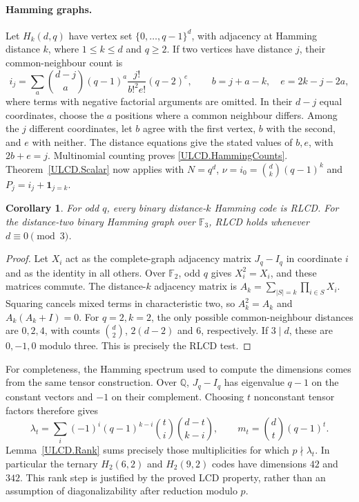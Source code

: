 \documentclass[11pt,a4paper]{article}
\newtheorem{corollary}[theorem]{Corollary}
\numberwithin{equation}{section}
\begin{document}
\paragraph{Hamming graphs.}
Let $H_k(d,q)$ have vertex set $\{0,\ldots,q-1\}^d$, with adjacency at
Hamming distance $k$, where $1\leq k\leq d$ and $q\geq2$. If two vertices
have distance $j$, their common-neighbour count is
\begin{equation}\label{ULCD.HammingCounts}
 i_j=\sum_a\binom{d-j}{a}(q-1)^a
 \frac{j!}{b!^2e!}(q-2)^e,
 \qquad b=j+a-k,\quad e=2k-j-2a,
\end{equation}
where terms with negative factorial arguments are omitted. In their $d-j$
equal coordinates, choose the $a$ positions where a common neighbour differs.
Among the $j$ different coordinates, let $b$ agree with the first vertex,
$b$ with the second, and $e$ with neither. The distance equations give the
stated values of $b,e$, with $2b+e=j$. Multinomial counting proves
\eqref{ULCD.HammingCounts}. Theorem~\ref{ULCD.Scalar} now applies with
$N=q^d$, $\nu=i_0=\binom dk(q-1)^k$ and $P_j=i_j+\mathbf1_{j=k}$.

\begin{corollary}\label{ULCD.HammingOddAlphabet}
For odd $q$, every binary distance-$k$ Hamming code is RLCD.
For the distance-two binary Hamming graph over $\mathbb F_3$, RLCD holds
whenever $d\equiv0\pmod3$.
\end{corollary}
\begin{proof}
Let $X_i$ act as the complete-graph adjacency matrix $J_q-I_q$ in coordinate
$i$ and as the identity in all others. Over $\mathbb F_2$, odd $q$ gives
$X_i^2=X_i$, and these matrices commute. The distance-$k$ adjacency matrix
is $A_k=\sum_{|S|=k}\prod_{i\in S}X_i$. Squaring cancels mixed terms in
characteristic two, so $A_k^2=A_k$ and $A_k(A_k+I)=0$.
For $q=2,k=2$, the only possible common-neighbour distances are $0,2,4$,
with counts $\binom d2$, $2(d-2)$ and $6$, respectively. If $3\mid d$,
these are $0,-1,0$ modulo three. This is precisely the RLCD test.
\end{proof}

For completeness, the Hamming spectrum used to compute the dimensions
comes from the same tensor construction. Over $\mathbb Q$, $J_q-I_q$
has eigenvalue $q-1$ on the constant vectors and $-1$ on their complement.
Choosing $t$ nonconstant tensor factors therefore gives
\[
 \lambda_t=\sum_i(-1)^i(q-1)^{k-i}\binom ti\binom{d-t}{k-i},
 \qquad m_t=\binom dt(q-1)^t.
\]
Lemma~\ref{ULCD.Rank} sums precisely those multiplicities for which
$p\nmid\lambda_t$. In particular the ternary $H_2(6,2)$ and $H_2(9,2)$
codes have dimensions $42$ and $342$. This rank step is justified by the
proved LCD property, rather than an assumption of diagonalizability after
reduction modulo $p$.
\end{document}
